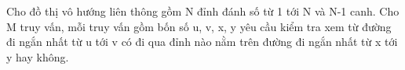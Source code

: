 Cho đồ thị vô hướng liên thông gồm N đỉnh đánh số từ 1 tới N và N-1 canh. Cho M truy vấn, mỗi truy vấn gồm bốn số u, v, x, y yêu cầu kiểm tra xem từ đường đi ngắn nhất từ u tới v có đi qua đỉnh nào nằm trên đường đi ngắn nhất từ x tới y hay không.
